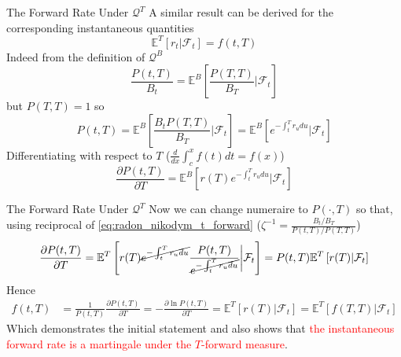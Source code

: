 \documentclass{beamer}
\begin{document}
\begin{frame}{The Forward Rate Under $\mathcal{Q}^T$}
  A similar result can be derived for the corresponding instantaneous quantities
  \begin{equation}
    \mathbb{E}^T[r_t|\mathcal{F}_t] = f(t,T)
  \end{equation}
	\pause
  Indeed from the definition of $\mathcal{Q}^B$
  \begin{equation*}
    \frac{P(t,T)}{B_t}=\mathbb{E}^B\left[\frac{P(T,T)}{B_T}\bigg|\mathcal{F}_t\right]
  \end{equation*}
  but $P(T,T)=1$ so
  \begin{equation*}
    P(t,T)=\mathbb{E}^B\left[\frac{B_tP(T,T)}{B_T}\bigg|\mathcal{F}_t\right]=\mathbb{E}^B\left[e^{-\int_t^Tr_u du}\big|\mathcal{F}_t\right]
  \end{equation*}
	\pause
  Differentiating with respect to $T$ ($\frac{d}{dx}\int_c^x f(t)dt=f(x)$)
  \begin{equation*}
    \frac{\partial P(t,T)}{\partial T}=
    \mathbb{E}^B\left[r(T)e^{-\int_t^Tr_u du}\big|\mathcal{F}_t\right]
  \end{equation*}
\end{frame}

\begin{frame}{The Forward Rate Under $\mathcal{Q}^T$}
  Now we can change numeraire to $P(\cdot,T)$ so that, using reciprocal of \cref{eq:radon_nikodym_t_forward} ($\zeta^{-1}=\frac{B_t/B_T}{P(t,T)/P(T,T)}$)
  \begin{equation*}
    \frac{\partial P(t,T)}{\partial T}=
    \mathbb{E}^T\left[r(T)\cancel{e^{-\int_t^Tr_u du}}\frac{P(t,T)}{\cancel{e^{-\int_t^Tr_u du}}}\bigg|\mathcal{F}_t\right]=
    P(t,T)\mathbb{E}^T\left[r(T)|\mathcal{F}_t\right]
  \end{equation*}
	\pause
  Hence
  \begin{equation*}
    \begin{aligned}
      f(t,T)&=\frac{1}{P(t,T)}\frac{\partial P(t,T)}{\partial T}=
      -\frac{\partial \ln P(t,T)}{\partial T}
      = \mathbb{E}^T\left[r(T)|\mathcal{F}_t\right]=	\mathbb{E}^T\left[f(T,T)|\mathcal{F}_t\right]
    \end{aligned}
  \end{equation*}
  Which demonstrates the initial statement and also shows that \textcolor{red}{the instantaneous forward rate is a martingale under the $T$-forward measure}.
\end{frame}

\end{document}
